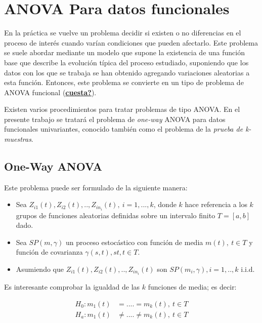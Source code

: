 \documentclass[
]{book}
\begin{document}
\hypertarget{anova-para-datos-funcionales}{%
\section{ANOVA Para datos funcionales}\label{anova-para-datos-funcionales}}

En la práctica se vuelve un problema decidir si existen o no diferencias en el proceso de interés cuando varían condiciones que pueden afectarlo. Este problema se suele abordar mediante un modelo que supone la existencia de una función base que describe la evolución típica del proceso estudiado, suponiendo que los datos con los que se trabaja se han obtenido agregando variaciones aleatorias a esta función. Entonces, este problema se convierte en un tipo de problema de ANOVA funcional (\protect\hyperlink{ref-cuesta}{\textbf{cuesta?}}).

Existen varios procedimientos para tratar problemas de tipo ANOVA. En el presente trabajo se tratará el problema de \emph{one-way} ANOVA para datos funcionales univariantes, conocido también como el problema de la \emph{prueba de k-muestras}.

\hypertarget{one-way-anova}{%
\subsection{One-Way ANOVA}\label{one-way-anova}}

Este problema puede ser formulado de la siguiente manera:

\begin{itemize}
\item
  Sea \(Z_{i1}(t), Z_{i2}(t),..,Z_{in_i}(t),\ i=1,...,k\), donde \(k\) hace referencia a los \(k\) grupos de funciones aleatorias definidas sobre un intervalo finito \(T=[a,b]\) dado.
\item
  Sea \(SP(m,\gamma)\) un proceso estocástico con función de media \(m(t),\ t\in T\) y función de covarianza \(\gamma(s,t), st,t\in T\).
\item
  Asumiendo que \(Z_{i1}(t), Z_{i2}(t),..,Z_{in_i}(t)\) son \(SP(m_i,\gamma),i=1,..,k\) i.i.d.
\end{itemize}

Es interesante comprobar la igualdad de las \(k\) funciones de media; es decir:

\begin{align}
    H_0:m_1(t)&=....=m_k(t),\ t\in T\\
    H_a:m_1(t)&\neq....\neq m_k(t),\ t\in T
\end{align}
\end{document}
